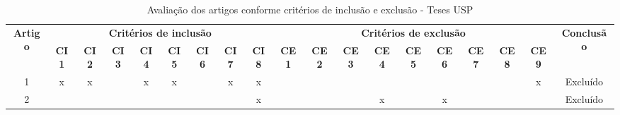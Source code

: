 \documentclass[
	12pt,				%
	oneside,			%
	a4paper,			%
	english,			%
	brazil				%
	]{abntex2ppgsi}
\begin{document}
\begin{apendicesenv}
\begin{table}[H]
\centering
\caption{Avaliação dos artigos conforme critérios de inclusão e exclusão - Teses USP}
\label{tab:crit_IncExc_TU}
\setlength{\tabcolsep}{1.5pt} %
\footnotesize %
\begin{tabular}{c | c c c c c c c c | c c c c c c c c c | c}
\toprule
    \multirow{2}{*}{\textbf{Artigo}} & 
    \multicolumn{8}{c|}{\textbf{Critérios de inclusão}} &
    \multicolumn{9}{c|}{\textbf{Critérios de exclusão}} &
    \multirow{2}{*}{\textbf{Conclusão}} \\ 
    \cline{2-18}
 & \tiny\textbf{CI1} & \tiny\textbf{CI2} & \tiny\textbf{CI3} & \tiny\textbf{CI4} & \tiny\textbf{CI5} & \tiny\textbf{CI6} & \tiny\textbf{CI7} & \tiny\textbf{CI8} & \tiny\textbf{CE1} & \tiny\textbf{CE2} & \tiny\textbf{CE3} & \tiny\textbf{CE4} & \tiny\textbf{CE5} & \tiny\textbf{CE6} & \tiny\textbf{CE7} & \tiny\textbf{CE8} & \tiny\textbf{CE9} & \\
\midrule
 1 & x & x &   & x & x &   & x & x &   &   &   &   &   &   &   &   & x & Excluído \\
 2 &   &   &   &   &   &   &   & x &   &   &   & x &   & x &   &   &   & Excluído \\
\bottomrule
\end{tabular}
\end{table}


\end{apendicesenv}
\end{document}
